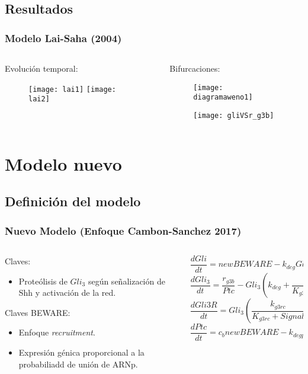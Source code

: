 \documentclass{beamer}
\begin{document}
\subsection{Resultados}
\begin{frame}
\frametitle{Modelo Lai-Saha (2004)}
\begin{columns}
	\begin{column}{0.5\textwidth}
		Evolución temporal:
		\begin{figure}
			\texttt{[image: lai1]}
			\texttt{[image: lai2]}
		\end{figure}
	\end{column}
	\begin{column}{0.5\textwidth}
		Bifurcaciones:
		\begin{figure}
			\texttt{[image: diagramaweno1]}
			
			\texttt{[image: gliVSr\_g3b]}
		\end{figure}
	\end{column}
\end{columns}
\end{frame}

\section{Modelo nuevo}

\subsection{Definición del modelo}

\begin{frame}
\frametitle{Nuevo Modelo (Enfoque Cambon-Sanchez 2017)}
\begin{columns}
	\begin{column}{0.5\textwidth}
		Claves:
		\begin{itemize}
			\item Proteólisis de $Gli_3$ según señalización de Shh y activación de la red.
		\end{itemize}
		Claves BEWARE:
		\begin{itemize}
			\item Enfoque \textit{recruitment}.
			\item Expresión génica proporcional a la probabiliadd de unión de ARNp.
		\end{itemize}
	\end{column}
	\begin{column}{0.5\textwidth}
		{\tiny\[ \frac{dGli}{dt} = newBEWARE-k_{deg}Gli \]}
		{\tiny\[ \frac{dGli_3}{dt} = \frac{r_{g3b}}{Ptc}-Gli_3\left(k_{deg}+\frac{k_{g3rc}}{K_{g3rc}+Signal}\right), \]}
		{\tiny\[ \frac{dGli3R}{dt}= Gli_3\left(\frac{k_{g3rc}}{K_{g3rc}+Signal}\right)-k_{deg}Gli3R, \]}
		{\tiny\[ \frac{dPtc}{dt} = c_bnewBEWARE-k_{degp}Ptc.\]}
		
	\end{column}
\end{columns}
\end{frame}
\end{document}
